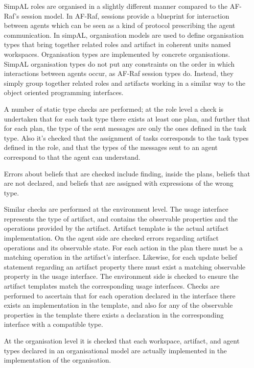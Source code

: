 \documentclass[a4paper,12pt,oneside,fleqn]{book} %
\begin{document}
SimpAL roles are organised in a slightly different manner compared to the
AF-Raf's session model. In AF-Raf, sessions provide a blueprint for
interaction between agents which can be seen as a kind of protocol
prescribing the agent communication. In simpAL, organisation models are used
to define organisation types that bring together related roles and
artifact in coherent units named workspaces. Organisation types are
implemented by concrete organisations. SimpAL organisation types do not put
any constraints on the order in which interactions between agents occur, as
AF-Raf session types do. Instead, they simply group together related roles
and artifacts working in a similar way to the object oriented programming
interfaces.

A number of static type checks are performed; at the role level a check is
undertaken that for each task type there exists at least one plan, and
further that for each plan, the type of the sent messages are only the ones
defined in the task type. Also it's checked that the assignment of tasks
corresponds to the task types defined in the role, and that the types of
the messages sent to an agent correspond to that the agent can understand.

Errors about beliefs that are checked include finding, inside the plans,
beliefs that are not declared, and beliefs that are assigned with
expressions of the wrong type.

Similar checks are performed at the environment level. The usage interface
represents the type of artifact, and contains the observable properties and
the operations provided by the artifact. Artifact template is the actual
artifact implementation. On the agent side are checked errors regarding
artifact operations and its observable state. For each action in the plan
there must be a matching operation in the artifact's interface.  Likewise,
for each update belief statement regarding an artifact property there must
exist a matching observable property in the usage interface. The
environment side is checked to ensure the artifact templates match the
corresponding usage interfaces. Checks are performed to ascertain
that for each operation declared in the interface there exists an
implementation in the template, and also for any of the observable properties
in the template there exists a declaration in the corresponding interface
with a compatible type.

At the organisation level it is checked that each workspace, artifact, and
agent types declared in an organisational model are actually implemented in
the implementation of the organisation.
\end{document}
